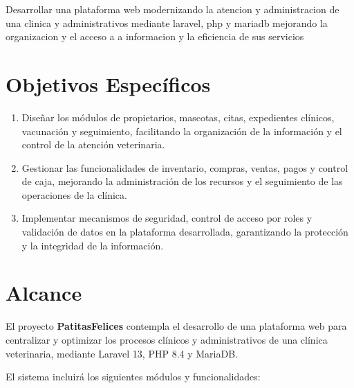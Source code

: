 Desarrollar una plataforma web modernizando la atencion y administracion de una clinica y administrativos mediante laravel, php y mariadb mejorando la organizacion y el acceso a a informacion y la eficiencia de sus servicios

\section{Objetivos Específicos}

\begin{enumerate}
    \item Diseñar los módulos de propietarios, mascotas, citas, expedientes clínicos, vacunación y seguimiento, facilitando la organización de la información y el control de la atención veterinaria.
    \item Gestionar las funcionalidades de inventario, compras, ventas, pagos y control de caja, mejorando la administración de los recursos y el seguimiento de las operaciones de la clínica.
    \item Implementar mecanismos de seguridad, control de acceso por roles y validación de datos en la plataforma desarrollada, garantizando la protección y la integridad de la información.
\end{enumerate}

\section{Alcance}

El proyecto \textbf{PatitasFelices} contempla el desarrollo de una plataforma web para centralizar y optimizar los procesos clínicos y administrativos de una clínica veterinaria, mediante Laravel 13, PHP 8.4 y MariaDB.

El sistema incluirá los siguientes módulos y funcionalidades:

